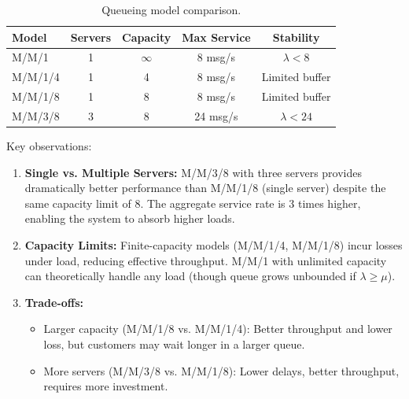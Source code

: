 \documentclass[12pt]{article}
\begin{document}
\begin{table}[H]
    \centering
    \begin{tabular}{lcccc}
        \toprule
        \textbf{Model} & \textbf{Servers} & \textbf{Capacity} & \textbf{Max Service} & \textbf{Stability} \\
        \midrule
        M/M/1          & 1                & $\infty$          & 8 msg/s              & $\lambda < 8$      \\
        M/M/1/4        & 1                & 4                 & 8 msg/s              & Limited buffer     \\
        M/M/1/8        & 1                & 8                 & 8 msg/s              & Limited buffer     \\
        M/M/3/8        & 3                & 8                 & 24 msg/s             & $\lambda < 24$     \\
        \bottomrule
    \end{tabular}
    \caption{Queueing model comparison.}
    \label{tab:model-comparison}
\end{table}

Key observations:

\begin{enumerate}
    \item \textbf{Single vs. Multiple Servers:} M/M/3/8 with three servers provides dramatically better performance than M/M/1/8 (single server) despite the same capacity limit of 8. The aggregate service rate is 3 times higher, enabling the system to absorb higher loads.

    \item \textbf{Capacity Limits:} Finite-capacity models (M/M/1/4, M/M/1/8) incur losses under load, reducing effective throughput. M/M/1 with unlimited capacity can theoretically handle any load (though queue grows unbounded if $\lambda \ge \mu$).

    \item \textbf{Trade-offs:}
          \begin{itemize}
              \item Larger capacity (M/M/1/8 vs. M/M/1/4): Better throughput and lower loss, but customers may wait longer in a larger queue.
              \item More servers (M/M/3/8 vs. M/M/1/8): Lower delays, better throughput, requires more investment.
          \end{itemize}
\end{enumerate}
\end{document}
